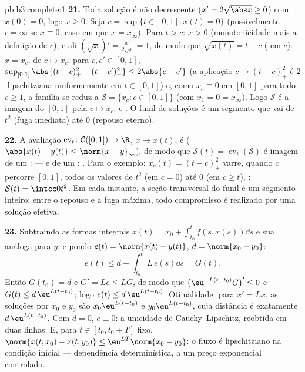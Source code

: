 \begin{solution}{pb:b3:complete:1}
\textbf{21.} Toda solução é não decrescente ($x' = 2\sqrt{\abs
x} \geq 0$) com $x(0) = 0$, logo $x \geq 0$. Seja $c =
\sup\{t \in [0,1] : x(t) = 0\}$ (possivelmente $c = \infty$ se
$x \equiv 0$, caso em que $x = x_\infty$). Para $t > c$: $x
> 0$ (monotonicidade mais a definição de $c$), e ali $(\sqrt
x)' = \frac{x'}{2\sqrt x} = 1$, de modo que $\sqrt{x(t)} = t - c$
( em $c$): $x = x_c$.  de $c \mapsto
x_c$: para $c, c' \in [0, 1]$, $\sup_{[0,1]}\abs{(t - c)_+^2 -
(t - c')_+^2} \leq 2\abs{c - c'}$ (a aplicação $c \mapsto
(t-c)_+^2$ é $2$-lipschitziana uniformemente em $t \in [0,1]$) e,
como $x_c \equiv 0$ em $[0,1]$ para todo $c \geq 1$, a
família se reduz a $\mathcal S = \{x_c : c \in [0,1]\}$ (com
$x_1 = 0 = x_\infty$). Logo $\mathcal S$ é a imagem do
  $[0,1]$ pela  $c
\mapsto x_c$:  e . O funil de soluções
é um segmento  que vai de $t^2$ (fuga
imediata) até $0$ (repouso eterno).

\textbf{22.} A avaliação $\operatorname{ev}_t\colon
\mathcal C([0,1]) \to \R$, $x \mapsto x(t)$, é 
($\abs{x(t) - y(t)} \leq \norm{x - y}_\infty$), de modo que $\mathcal
S(t) = \operatorname{ev}_t(\mathcal S)$ é imagem 
de um :  --- e de um : .
Para o exemplo: $x_c(t) = (t - c)_+^2$ varre, quando $c$ percorre
$[0, 1]$, todos os valores de $t^2$ (em $c = 0$) até
$0$ (em $c \geq t$), : $\mathcal S(t) =
\intcc0{t^2}$. Em cada instante, a seção transversal do funil é
um segmento inteiro: entre o repouso e a fuga máxima, todo
compromisso é realizado por uma solução efetiva.

\textbf{23.} Subtraindo as formas integrais $x(t) = x_0 +
\int_{t_0}^tf(s, x(s))\dd s$ e sua análoga para $y$, e
pondo $e(t) = \norm{x(t) - y(t)}$, $d = \norm{x_0 - y_0}$:
\[
e(t) \leq d + \int_{t_0}^tL\,e(s)\dd s = G(t).
\]
Então $G(t_0) = d$ e $G' = Le \leq LG$, de modo que $\bigl(\eu^{-L(t
- t_0)}G\bigr)' \leq 0$ e $G(t) \leq d\,\eu^{L(t - t_0)}$;
logo $e(t) \leq d\,\eu^{L(t-t_0)}$. Otimalidade: para $x' =
Lx$, as soluções por $x_0$ e $y_0$ são $x_0\eu^{L(t -
t_0)}$ e $y_0\eu^{L(t-t_0)}$, cuja distância é exatamente
$d\,\eu^{L(t-t_0)}$. Com $d = 0$, $e \equiv 0$:
a unicidade de Cauchy--Lipschitz, reobtida em duas linhas. E,
para $t \in [t_0, t_0 + T]$ fixo, $\norm{x(t; x_0) - x(t;
y_0)} \leq \eu^{LT}\norm{x_0 - y_0}$: o fluxo é lipschitziano
na condição inicial --- dependência determinística, a um
preço exponencial controlado.


\end{solution}
